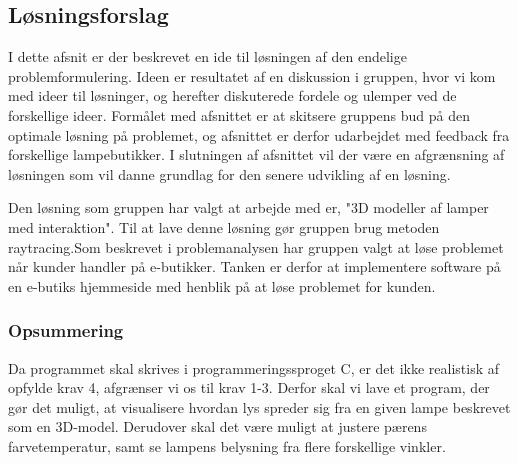 \subsection{Løsningsforslag}
\label{sec:losning}
I dette afsnit er der beskrevet en ide til løsningen af den endelige problemformulering. Ideen er resultatet af en diskussion i gruppen, hvor vi kom med ideer til løsninger, og herefter diskuterede fordele og ulemper ved de forskellige ideer. Formålet med afsnittet er at skitsere gruppens bud på den optimale løsning på problemet, og afsnittet er derfor udarbejdet med feedback fra forskellige lampebutikker. I slutningen af afsnittet vil der være en afgrænsning af løsningen som vil danne grundlag for den senere udvikling af en løsning.

Den løsning som gruppen har valgt at arbejde med er, "3D modeller af lamper med interaktion". Til at lave denne løsning gør gruppen brug metoden raytracing.\newline Som beskrevet i problemanalysen har gruppen valgt at løse problemet når kunder handler på e-butikker. Tanken er derfor at implementere software på en e-butiks hjemmeside med henblik på at løse problemet for kunden.





\subsubsection*{Opsummering}

Da programmet skal skrives i programmeringssproget C, er det ikke realistisk af opfylde krav 4, afgrænser vi os til krav 1-3. Derfor skal vi lave et program, der gør det muligt, at visualisere hvordan lys spreder sig fra en given lampe beskrevet som en 3D-model. Derudover skal det være muligt at justere pærens farvetemperatur, samt se lampens belysning fra flere forskellige vinkler. 